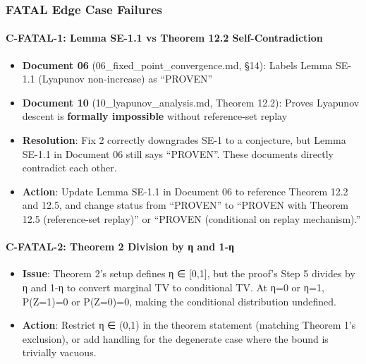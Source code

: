\documentclass[
  12pt,
]{ctexart}
\providecommand{\tightlist}{%
  \setlength{\itemsep}{0pt}\setlength{\parskip}{0pt}}
\begin{document}
\subsubsection{FATAL Edge Case Failures}\label{fatal-edge-case-failures}

\paragraph{C-FATAL-1: Lemma SE-1.1 vs Theorem 12.2
Self-Contradiction}\label{c-fatal-1-lemma-se-1.1-vs-theorem-12.2-self-contradiction}

\begin{itemize}
\tightlist
\item
  \textbf{Document 06} (06\_fixed\_point\_convergence.md, §14): Labels
  Lemma SE-1.1 (Lyapunov non-increase) as ``PROVEN''
\item
  \textbf{Document 10} (10\_lyapunov\_analysis.md, Theorem 12.2): Proves
  Lyapunov descent is \textbf{formally impossible} without reference-set
  replay
\item
  \textbf{Resolution}: Fix 2 correctly downgrades SE-1 to a conjecture,
  but Lemma SE-1.1 in Document 06 still says ``PROVEN''. These documents
  directly contradict each other.
\item
  \textbf{Action}: Update Lemma SE-1.1 in Document 06 to reference
  Theorem 12.2 and 12.5, and change status from ``PROVEN'' to ``PROVEN
  with Theorem 12.5 (reference-set replay)'' or ``PROVEN (conditional on
  replay mechanism).''
\end{itemize}

\paragraph{C-FATAL-2: Theorem 2 Division by η and
1-η}\label{c-fatal-2-theorem-2-division-by-ux3b7-and-1-ux3b7}

\begin{itemize}
\tightlist
\item
  \textbf{Issue}: Theorem 2's setup defines η ∈ {[}0,1{]}, but the
  proof's Step 5 divides by η and 1-η to convert marginal TV to
  conditional TV. At η=0 or η=1, P(Z=1)=0 or P(Z=0)=0, making the
  conditional distribution undefined.
\item
  \textbf{Action}: Restrict η ∈ (0,1) in the theorem statement (matching
  Theorem 1's exclusion), or add handling for the degenerate case where
  the bound is trivially vacuous.
\end{itemize}
\end{document}
